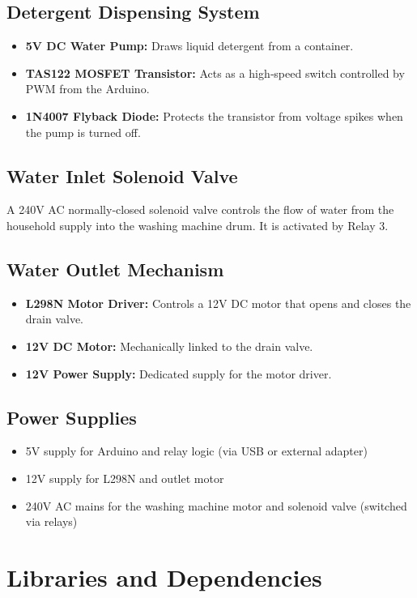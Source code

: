\subsection{Detergent Dispensing System}
\begin{itemize}
    \item \textbf{5V DC Water Pump:} Draws liquid detergent from a container.
    \item \textbf{TAS122 MOSFET Transistor:} Acts as a high‑speed switch controlled by PWM from the Arduino.
    \item \textbf{1N4007 Flyback Diode:} Protects the transistor from voltage spikes when the pump is turned off.
\end{itemize}

\subsection{Water Inlet Solenoid Valve}
A 240V AC normally‑closed solenoid valve controls the flow of water from the household supply into the washing machine drum. It is activated by Relay 3.

\subsection{Water Outlet Mechanism}
\begin{itemize}
    \item \textbf{L298N Motor Driver:} Controls a 12V DC motor that opens and closes the drain valve.
    \item \textbf{12V DC Motor:} Mechanically linked to the drain valve.
    \item \textbf{12V Power Supply:} Dedicated supply for the motor driver.
\end{itemize}

\subsection{Power Supplies}
\begin{itemize}
    \item 5V supply for Arduino and relay logic (via USB or external adapter)
    \item 12V supply for L298N and outlet motor
    \item 240V AC mains for the washing machine motor and solenoid valve (switched via relays)
\end{itemize}

\section{Libraries and Dependencies}

